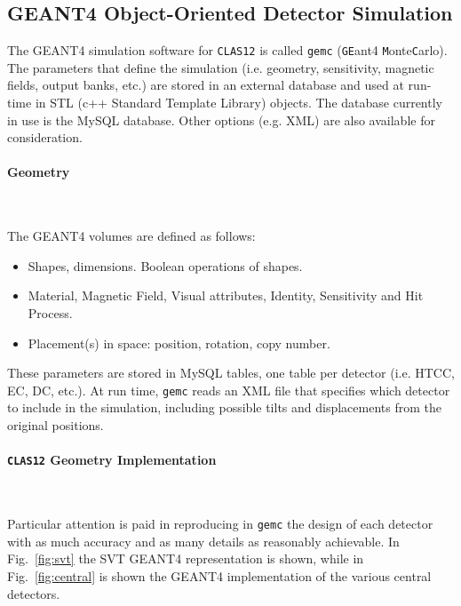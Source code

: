 \subsection{GEANT4 Object-Oriented Detector Simulation}

The GEANT4 simulation software for {\tt CLAS12} is called {\tt gemc} 
({\tt GE}ant4 {\tt M}onte{\tt C}arlo).  The parameters that define the 
simulation (i.e. geometry, sensitivity, magnetic fields, output banks, etc.)
are stored in an external database and used at run-time in STL (c++ Standard 
Template Library) objects.  The database currently in use is the MySQL 
database. Other options (e.g. XML) are also available for consideration.

\paragraph{Geometry}

~~

\vskip 0.3cm

\noindent
The GEANT4 volumes are defined as follows:

\begin{itemize}
\item Shapes, dimensions. Boolean operations of shapes.
\item Material, Magnetic Field, Visual attributes, Identity, Sensitivity 
and Hit Process.
\item Placement(s) in space: position, rotation, copy number.
\end{itemize}

\noindent
These parameters are stored in MySQL tables, one table per detector 
(i.e. HTCC, EC, DC, etc.).  At run time, {\tt gemc} reads an XML file 
that specifies which detector to include in the simulation, including 
possible tilts and displacements from the original positions.

\paragraph{{\tt CLAS12} Geometry Implementation}

~~

\vskip 0.3cm

Particular attention is paid in reproducing in {\tt gemc} the design of each 
detector with as much accuracy and as many details as reasonably achievable.
In Fig.~\ref{fig:svt} the SVT GEANT4 representation is shown, while in 
Fig.~\ref{fig:central} is shown the GEANT4 implementation of the various 
central detectors.

